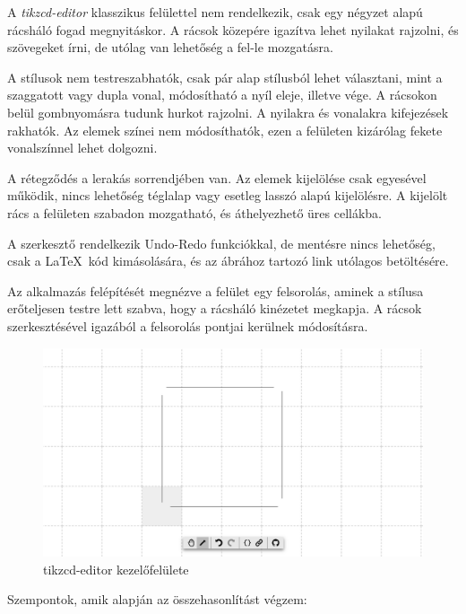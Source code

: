 
A \textit{tikzcd-editor} klasszikus felülettel nem rendelkezik, csak egy négyzet alapú rácsháló fogad megnyitáskor. A rácsok közepére igazítva lehet nyilakat rajzolni, és szövegeket írni, de utólag van lehetőség a fel-le mozgatásra. 

A stílusok nem testreszabhatók, csak pár alap stílusból lehet választani, mint a szaggatott vagy dupla vonal, módosítható a nyíl eleje, illetve vége. A rácsokon belül gombnyomásra tudunk hurkot rajzolni. A nyilakra és vonalakra kifejezések rakhatók. Az elemek színei nem módosíthatók, ezen a felületen kizárólag fekete vonalszínnel lehet dolgozni.

A rétegződés a lerakás sorrendjében van. Az elemek kijelölése csak egyesével működik, nincs lehetőség téglalap vagy esetleg lasszó alapú kijelölésre. A kijelölt rács a felületen szabadon mozgatható, és áthelyezhető üres cellákba.

A szerkesztő rendelkezik Undo-Redo funkciókkal, de mentésre nincs lehetőség, csak a \LaTeX\ kód kimásolására, és az ábrához tartozó link utólagos betöltésére.

Az alkalmazás felépítését megnézve a felület egy felsorolás, aminek a stílusa erőteljesen testre lett szabva, hogy a rácsháló kinézetet megkapja. A rácsok szerkesztésével igazából a felsorolás pontjai kerülnek módosításra.

\begin{figure}[!h]
	\includegraphics[width=\textwidth]{images/tikzcd.png}
	\caption{tikzcd-editor kezelőfelülete \cite{tikzcd}}
	\label{fig:tikzcd}
\end{figure}



Szempontok, amik alapján az összehasonlítást végzem:

